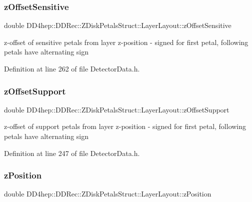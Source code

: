 \subsubsection{\texorpdfstring{z\+Offset\+Sensitive}{zOffsetSensitive}}
{\footnotesize\ttfamily double D\+D4hep\+::\+D\+D\+Rec\+::\+Z\+Disk\+Petals\+Struct\+::\+Layer\+Layout\+::z\+Offset\+Sensitive}

z-\/offset of sensitive petals from layer z-\/position -\/ signed for first petal, following petals have alternating sign 

Definition at line 262 of file Detector\+Data.\+h.

\hypertarget{struct_d_d4hep_1_1_d_d_rec_1_1_z_disk_petals_struct_1_1_layer_layout_acce2801e94b24764955762c2a659e96b}{}\label{struct_d_d4hep_1_1_d_d_rec_1_1_z_disk_petals_struct_1_1_layer_layout_acce2801e94b24764955762c2a659e96b} 
\subsubsection{\texorpdfstring{z\+Offset\+Support}{zOffsetSupport}}
{\footnotesize\ttfamily double D\+D4hep\+::\+D\+D\+Rec\+::\+Z\+Disk\+Petals\+Struct\+::\+Layer\+Layout\+::z\+Offset\+Support}

z-\/offset of support petals from layer z-\/position -\/ signed for first petal, following petals have alternating sign 

Definition at line 247 of file Detector\+Data.\+h.

\hypertarget{struct_d_d4hep_1_1_d_d_rec_1_1_z_disk_petals_struct_1_1_layer_layout_a2b501a3aa1eb000afd0c2b15a3fa3ff0}{}\label{struct_d_d4hep_1_1_d_d_rec_1_1_z_disk_petals_struct_1_1_layer_layout_a2b501a3aa1eb000afd0c2b15a3fa3ff0} 
\subsubsection{\texorpdfstring{z\+Position}{zPosition}}
{\footnotesize\ttfamily double D\+D4hep\+::\+D\+D\+Rec\+::\+Z\+Disk\+Petals\+Struct\+::\+Layer\+Layout\+::z\+Position}



